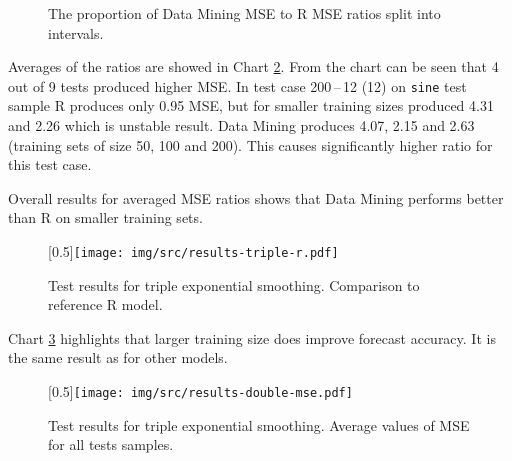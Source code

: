         \begin{figure}[H]
            \begin{center}
                \caption{The proportion of Data Mining MSE to R MSE ratios split into intervals.}
                \label{img:results-triple-pie}
            \end{center}
        \end{figure}

        Averages of the ratios are showed in Chart \ref{img:results-triple-r}. From the chart can be seen that 4 out of 9
        tests produced higher MSE. In test case 200\,--\,12 (12) on \texttt{sine} test sample R produces only 0.95 MSE,
        but for smaller training sizes produced 4.31 and 2.26 which is unstable result. Data Mining produces 4.07, 2.15
        and  2.63 (training sets of size 50, 100 and 200). This causes significantly 
        higher ratio for this test case.

        Overall results for averaged MSE ratios shows that Data Mining performs better than R on smaller training sets.

        \begin{figure}[H]
            \begin{center}
                \scalebox{0.65}[0.5]{\texttt{[image: img/src/results-triple-r.pdf]}}
                \caption{Test results for triple exponential smoothing. Comparison to reference R model.}
                \label{img:results-triple-r}
            \end{center}
        \end{figure}

        Chart \ref{img:results-triple-mse} highlights that larger training size does improve forecast accuracy. It is
        the same result as for other models.

        \begin{figure}[H]
            \begin{center}
                \scalebox{0.65}[0.5]{\texttt{[image: img/src/results-double-mse.pdf]}}
                \caption{Test results for triple exponential smoothing. Average values of MSE for all tests samples.}
                \label{img:results-triple-mse}
            \end{center}
        \end{figure}

